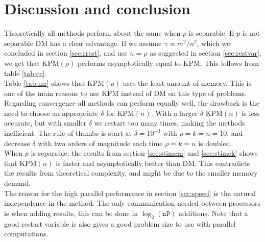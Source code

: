 \chapter{Discussion and conclusion}%

Theoretically all methods perform about the same when $p$ is separable. If $p$ is not separable DM has a clear advantage. If we assume $\gamma \propto m^2/n^2$, which we concluded in section \ref{sec:rrest}, and use $n = \rho$ as suggested in section \ref{sec:restvar}, we get that KPM$(\rho)$ performs asymptotically equal to KPM. This follows from table \ref{tab:cc}. \\



Table \ref{tab:mr} shows that KPM$(\rho)$ uses the least amount of memory. This is one of the main reasons to use KPM instead of DM on this type of problems. \\

Regarding convergence all methods can perform equally well, the drawback is the need to choose an appropriate $\delta$ for KPM$(n)$. With a larger $\delta$ KPM$(n)$ is less accurate, but with smaller $\delta$ we restart too many times, making the methods inefficient. The rule of thumbs is start at $\delta=10^{-3}$ with $\rho = k = n = 10$, and decrease $\delta$ with two orders of magnitude each time $\rho = k = n$ is doubled. \\

When $p$ is separable, the results from section \ref{sec:stimem} and \ref{sec:stimek} shows that KPM$(n)$ is faster and asymptotically better than DM. This contradicts the results from theoretical complexity, and might be due to the smaller memory demand. \\

The reason for the high parallel performance in section \ref{sec:speed} is the natural independence in the method. The only communication needed between processors is when adding results, this can be done in $\log_2(\texttt{nP})$ additions. Note that a good restart variable is also gives a good problem size to use with parallel computations. \\


